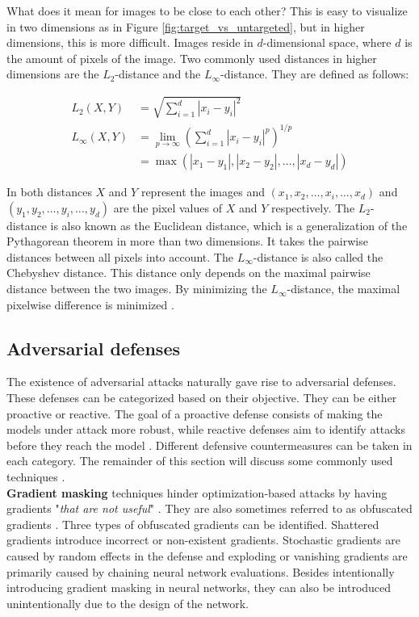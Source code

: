 What does it mean for images to be close to each other? This is easy to visualize in two dimensions as in Figure \ref{fig:target_vs_untargeted}, but in higher dimensions, this is more difficult. Images reside in $d$-dimensional space, where $d$ is the amount of pixels of the image. Two commonly used distances in higher dimensions are the $L_2$-distance and the $L_\infty$-distance. They are defined as follows:

\begin{align*}
L_2(X, Y) &= \sqrt{\sum_{i=1}^d|x_i - y_i|^2} \\
L_\infty(X, Y) &= \lim_{p\rightarrow \infty}\left( \sum_{i=1}^d|x_i-y_i|^p\right)^{1/p} \\
&= \max (|x_1 - y_1|, |x_2-y_2|, \ldots, |x_d-y_d|)
\end{align*}

In both distances $X$ and $Y$ represent the images and $(x_1, x_2, \ldots, x_i, \ldots, x_d)$ and $(y_1, y_2, \ldots, y_i, \ldots, y_d)$ are the pixel values of $X$ and $Y$ respectively. The $L_2$-distance is also known as the Euclidean distance, which is a generalization of the Pythagorean theorem in more than two dimensions. It takes the pairwise distances between all pixels into account. The $L_\infty$-distance is also called the Chebyshev distance. This distance only depends on the maximal pairwise distance between the two images. By minimizing the $L_\infty$-distance, the maximal pixelwise difference is minimized \cite{wiki_distances}. 

\subsection{Adversarial defenses}\label{sec:adversarial_defenses}
The existence of adversarial attacks naturally gave rise to adversarial defenses. These defenses can be categorized based on their objective. They can be either proactive or reactive. The goal of a proactive defense consists of making the models under attack more robust, while reactive defenses aim to identify attacks before they reach the model \cite{adversarial_defense_survey}. Different defensive countermeasures can be taken in each category. The remainder of this section will discuss some commonly used techniques \cite{defenses_survey}.\\

\textbf{Gradient masking} techniques hinder optimization-based attacks by having gradients "\textit{that are not useful}" \cite{not_useful_gradients}. They are also sometimes referred to as obfuscated gradients \cite{obfuscated_gradients}. Three types of obfuscated gradients can be identified. Shattered gradients introduce incorrect or non-existent gradients. Stochastic gradients are caused by random effects in the defense and exploding or vanishing gradients are primarily caused by chaining neural network evaluations. Besides intentionally introducing gradient masking in neural networks, they can also be introduced unintentionally due to the design of the network.\\

